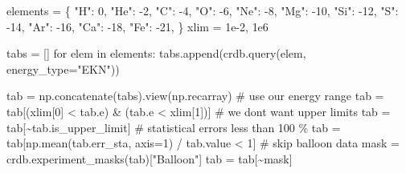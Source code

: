 \documentclass[
  letterpaper,
  DIV=11,
  numbers=noendperiod]{scrreprt}
\newenvironment{Shaded}{\begin{snugshade}}{\end{snugshade}}
\newcommand{\CommentTok}[1]{\textcolor[rgb]{0.37,0.37,0.37}{#1}}
\newcommand{\ControlFlowTok}[1]{\textcolor[rgb]{0.00,0.23,0.31}{#1}}
\newcommand{\DecValTok}[1]{\textcolor[rgb]{0.68,0.00,0.00}{#1}}
\newcommand{\FloatTok}[1]{\textcolor[rgb]{0.68,0.00,0.00}{#1}}
\newcommand{\KeywordTok}[1]{\textcolor[rgb]{0.00,0.23,0.31}{#1}}
\newcommand{\NormalTok}[1]{\textcolor[rgb]{0.00,0.23,0.31}{#1}}
\newcommand{\OperatorTok}[1]{\textcolor[rgb]{0.37,0.37,0.37}{#1}}
\newcommand{\StringTok}[1]{\textcolor[rgb]{0.13,0.47,0.30}{#1}}
\begin{document}
\begin{Shaded}
\begin{Highlighting}[]
\NormalTok{elements }\OperatorTok{=}\NormalTok{ \{}
    \StringTok{"H"}\NormalTok{: }\DecValTok{0}\NormalTok{,}
    \StringTok{"He"}\NormalTok{: }\OperatorTok{{-}}\DecValTok{2}\NormalTok{,}
    \StringTok{"C"}\NormalTok{: }\OperatorTok{{-}}\DecValTok{4}\NormalTok{,}
    \StringTok{"O"}\NormalTok{: }\OperatorTok{{-}}\DecValTok{6}\NormalTok{,}
    \StringTok{"Ne"}\NormalTok{: }\OperatorTok{{-}}\DecValTok{8}\NormalTok{,}
    \StringTok{"Mg"}\NormalTok{: }\OperatorTok{{-}}\DecValTok{10}\NormalTok{,}
    \StringTok{"Si"}\NormalTok{: }\OperatorTok{{-}}\DecValTok{12}\NormalTok{,}
    \StringTok{"S"}\NormalTok{: }\OperatorTok{{-}}\DecValTok{14}\NormalTok{,}
    \StringTok{"Ar"}\NormalTok{: }\OperatorTok{{-}}\DecValTok{16}\NormalTok{,}
    \StringTok{"Ca"}\NormalTok{: }\OperatorTok{{-}}\DecValTok{18}\NormalTok{,}
    \StringTok{"Fe"}\NormalTok{: }\OperatorTok{{-}}\DecValTok{21}\NormalTok{,}
\NormalTok{\}}
\NormalTok{xlim }\OperatorTok{=} \FloatTok{1e{-}2}\NormalTok{, }\FloatTok{1e6}

\NormalTok{tabs }\OperatorTok{=}\NormalTok{ []}
\ControlFlowTok{for}\NormalTok{ elem }\KeywordTok{in}\NormalTok{ elements:}
\NormalTok{    tabs.append(crdb.query(elem, energy\_type}\OperatorTok{=}\StringTok{"EKN"}\NormalTok{))}

\NormalTok{tab }\OperatorTok{=}\NormalTok{ np.concatenate(tabs).view(np.recarray)}
\CommentTok{\# use our energy range}
\NormalTok{tab }\OperatorTok{=}\NormalTok{ tab[(xlim[}\DecValTok{0}\NormalTok{] }\OperatorTok{\textless{}}\NormalTok{ tab.e) }\OperatorTok{\&}\NormalTok{ (tab.e }\OperatorTok{\textless{}}\NormalTok{ xlim[}\DecValTok{1}\NormalTok{])]}
\CommentTok{\# we don\textquotesingle{}t want upper limits}
\NormalTok{tab }\OperatorTok{=}\NormalTok{ tab[}\OperatorTok{\textasciitilde{}}\NormalTok{tab.is\_upper\_limit]}
\CommentTok{\# statistical errors less than 100 \%}
\NormalTok{tab }\OperatorTok{=}\NormalTok{ tab[np.mean(tab.err\_sta, axis}\OperatorTok{=}\DecValTok{1}\NormalTok{) }\OperatorTok{/}\NormalTok{ tab.value }\OperatorTok{\textless{}} \DecValTok{1}\NormalTok{]}
\CommentTok{\# skip balloon data}
\NormalTok{mask }\OperatorTok{=}\NormalTok{ crdb.experiment\_masks(tab)[}\StringTok{"Balloon"}\NormalTok{]}
\NormalTok{tab }\OperatorTok{=}\NormalTok{ tab[}\OperatorTok{\textasciitilde{}}\NormalTok{mask]}


\end{Highlighting}
\end{Shaded}
\end{document}
